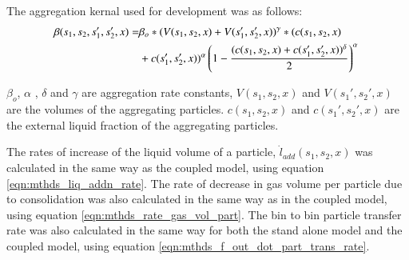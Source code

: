 The aggregation kernal used for development was as follows:
\begin{align}
\beta(s_1,s_2,s_1',s_2',x) = & \beta_o*(V(s_1,s_2,x)+V(s_1',s_2',x))^{\gamma}*(c(s_1,s_2,x)\notag\\
&+c(s_1',s_2',x))^{\alpha}\left(1-\frac{(c(s_1,s_2,x)+c(s_1',s_2',x))^{\delta}}{2}\right)^{\alpha}\
\label{eqn:mthds_sa_pbm_beta_kernal} 
\end{align}

$\beta_o$,  $\alpha$ , $\delta$ and $\gamma$ are aggregation rate constants, $V(s_1,s_2, x)$ and $V(s_1',s_2',x)$ are the volumes of the aggregating particles. $c(s_1,s_2, x)$ and $c(s_1',s_2',x)$ are the external liquid fraction of the aggregating particles.







The rates of increase of the liquid volume of a particle, $\dot{l}_{add}(s_1,s_2,x)$ was calculated in the same 
way as the coupled model, using equation \ref{eqn:mthds_liq_addn_rate}. The rate of decrease in gas volume 
per particle due to consolidation was also calculated in the same way as in the coupled model, using equation 
\ref{eqn:mthds_rate_gas_vol_part}. The bin to bin particle transfer rate was also calculated in the same way 
for both the stand alone model and the coupled model, using equation \ref{eqn:mthds_f_out_dot_part_trans_rate}.


